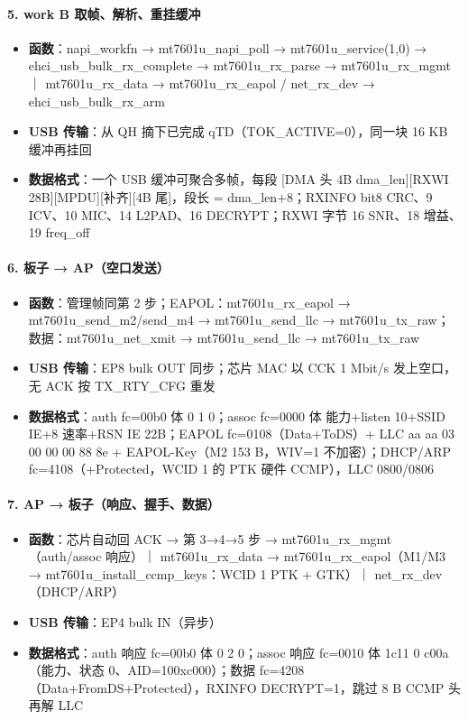 \documentclass[UTF8,zihao=-4,fontset=none]{ctexart}
\begin{document}
\paragraph*{5. work B 取帧、解析、重挂缓冲}
\begin{itemize}[leftmargin=2em,itemsep=1pt]
\item \textbf{函数}：napi\_workfn → mt7601u\_napi\_poll → mt7601u\_service(1,0) → ehci\_usb\_bulk\_rx\_complete → mt7601u\_rx\_parse → mt7601u\_rx\_mgmt ｜ mt7601u\_rx\_data → mt7601u\_rx\_eapol / net\_rx\_dev → ehci\_usb\_bulk\_rx\_arm
\item \textbf{USB 传输}：从 QH 摘下已完成 qTD（TOK\_ACTIVE=0），同一块 16 KB 缓冲再挂回
\item \textbf{数据格式}：一个 USB 缓冲可聚合多帧，每段 [DMA 头 4B dma\_len][RXWI 28B][MPDU][补齐][4B 尾]，段长 = dma\_len+8；RXINFO bit8 CRC、9 ICV、10 MIC、14 L2PAD、16 DECRYPT；RXWI 字节 16 SNR、18 增益、19 freq\_off
\end{itemize}

\paragraph*{6. 板子 → AP（空口发送）}
\begin{itemize}[leftmargin=2em,itemsep=1pt]
\item \textbf{函数}：管理帧同第 2 步；EAPOL：mt7601u\_rx\_eapol → mt7601u\_send\_m2/send\_m4 → mt7601u\_send\_llc → mt7601u\_tx\_raw；数据：mt7601u\_net\_xmit → mt7601u\_send\_llc → mt7601u\_tx\_raw
\item \textbf{USB 传输}：EP8 bulk OUT 同步；芯片 MAC 以 CCK 1 Mbit/s 发上空口，无 ACK 按 TX\_RTY\_CFG 重发
\item \textbf{数据格式}：auth fc=00b0 体 0 1 0；assoc fc=0000 体 能力+listen 10+SSID IE+8 速率+RSN IE 22B；EAPOL fc=0108（Data+ToDS）+ LLC aa aa 03 00 00 00 88 8e + EAPOL-Key（M2 153 B，WIV=1 不加密）；DHCP/ARP fc=4108（+Protected，WCID 1 的 PTK 硬件 CCMP），LLC 0800/0806
\end{itemize}

\paragraph*{7. AP → 板子（响应、握手、数据）}
\begin{itemize}[leftmargin=2em,itemsep=1pt]
\item \textbf{函数}：芯片自动回 ACK → 第 3→4→5 步 → mt7601u\_rx\_mgmt（auth/assoc 响应）｜ mt7601u\_rx\_data → mt7601u\_rx\_eapol（M1/M3 → mt7601u\_install\_ccmp\_keys：WCID 1 PTK + GTK）｜ net\_rx\_dev（DHCP/ARP）
\item \textbf{USB 传输}：EP4 bulk IN（异步）
\item \textbf{数据格式}：auth 响应 fc=00b0 体 0 2 0；assoc 响应 fc=0010 体 1c11 0 c00a（能力、状态 0、AID=10\textbar{}0xc000）；数据 fc=4208（Data+FromDS+Protected），RXINFO DECRYPT=1，跳过 8 B CCMP 头再解 LLC
\end{itemize}
\end{document}
